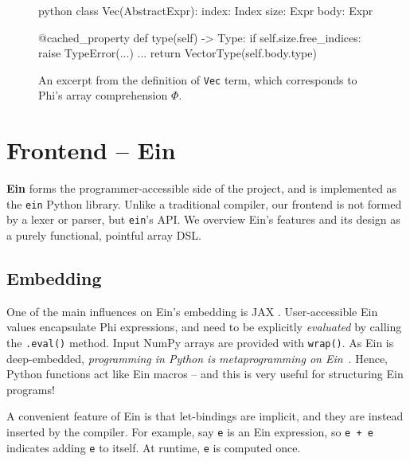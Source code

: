 \begin{figure}[b]
    \centering
    \begin{cminted}{python}
class Vec(AbstractExpr):
    index: Index
    size: Expr
    body: Expr

    @cached_property
    def type(self) -> Type:
        if self.size.free_indices: raise TypeError(...)
        ...
        return VectorType(self.body.type)
    \end{cminted}
    \caption{An excerpt from the definition of \texttt{Vec} term, which corresponds to Phi's array comprehension $\Phi$.}
    \label{fig:example-phi-def}
\end{figure}


\needspace{15em}
\section{Frontend -- Ein}
\label{ein-dsl}

\textbf{Ein} forms the programmer-accessible side of the project, and is implemented as the \texttt{ein} Python library. Unlike a traditional compiler, our frontend is not formed by a lexer or parser, but \texttt{ein}'s API. We overview Ein's features and its design as a purely functional, pointful array DSL.

\subsection{Embedding}

One of the main influences on Ein's embedding is JAX \cite{frostig2018compiling}.
User-accessible Ein values encapsulate Phi expressions, and need to be explicitly \textit{evaluated} by calling the \texttt{.eval()} method. Input NumPy arrays are provided with \texttt{wrap()}.
As Ein is deep-embedded, \textit{programming in Python is metaprogramming on Ein}~\cite{atkey2009unembedding}. Hence, Python functions act like Ein macros -- and this is very useful for structuring Ein programs!

A convenient feature of Ein is that let-bindings are implicit, and they are instead inserted by the compiler.
For example, say \texttt{e} is an Ein expression, so \texttt{e + e} indicates adding \texttt{e} to itself. 
At runtime, \texttt{e} is computed once.

